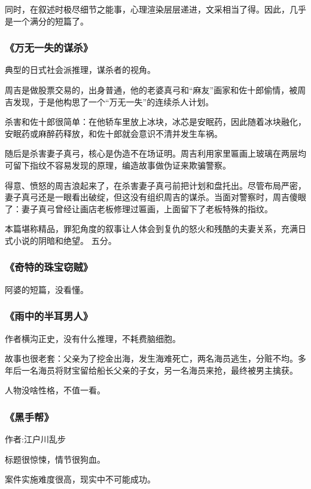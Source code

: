 同时，在叙述时极尽细节之能事，心理渲染层层递进，文采相当了得。因此，几乎是一个满分的短篇了。

\subsubsection{《万无一失的谋杀》}

典型的日式社会派推理，谋杀者的视角。

周吉是做股票交易的，出身普通，他的老婆真弓和“麻友”画家和佐十郎偷情，被周吉发现，于是他构思了一个“万无一失”的连续杀人计划。

杀害和佐十郎很简单：在他轿车里放上冰块，冰芯是安眠药，因此随着冰块融化，安眠药或麻醉药释放，和佐十郎就会意识不清并发生车祸。

随后是杀害妻子真弓，核心是伪造不在场证明。周吉利用家里匾画上玻璃在两层均可留下指纹不容易发现的原理，编造故事做伪证来欺骗警察。

得意、愤怒的周吉浪起来了，在杀害妻子真弓前把计划和盘托出。尽管布局严密，妻子真弓还是一眼看出破绽，但这没有组织周吉的谋杀。当面对警察时，周吉傻眼了：妻子真弓曾经让画店老板修理过匾画，上面留下了老板特殊的指纹。

本篇堪称精品，罪犯角度的叙事让人体会到复仇的怒火和残酷的夫妻关系，充满日式小说的阴暗和绝望。
五分。

\subsubsection{《奇特的珠宝窃贼》}

阿婆的短篇，没看懂。

\subsubsection{《雨中的半耳男人》}

作者横沟正史，没有什么推理，不耗费脑细胞。

故事也很老套：父亲为了挖金出海，发生海难死亡，两名海员逃生，分赃不均。多年后一名海员将财宝留给船长父亲的子女，另一名海员来抢，最终被男主擒获。

人物没啥性格，不值一看。

\subsubsection{《黑手帮》}

作者:江户川乱步

标题很惊悚，情节很狗血。

案件实施难度很高，现实中不可能成功。

